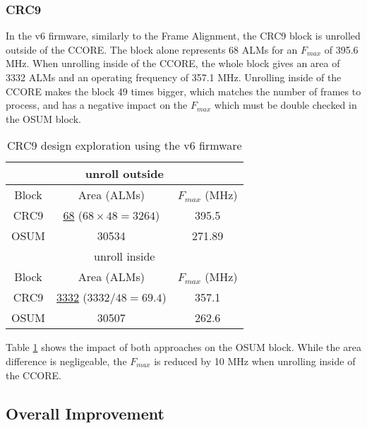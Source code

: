 
\subsubsection{CRC9}

In the v6 firmware, similarly to the Frame Alignment, the CRC9 block is unrolled outside of the CCORE. The block alone represents 68 ALMs for an \(F_{max}\) of 395.6 MHz. When unrolling inside of the CCORE, the whole block gives an area of 3332 ALMs and an operating frequency of 357.1 MHz. Unrolling inside of the CCORE makes the block 49 times bigger, which matches the number of frames to process, and has a negative impact on the \(F_{max}\) which must be double checked in the OSUM block.

\begin{table}[ht]
    \centering
    \begin{tabular}{|c|c|c|}
        \hline
        \hline
        \multicolumn{3}{|c|}{unroll outside} \\
        \hline
        Block & Area (ALMs) & \(F_{max}\) (MHz) \\
        \hline
        CRC9 & \underline{68} (\(68\times48=3264\)) & 395.5 \\
        OSUM & 30534 & 271.89 \\
        \hline
        \hline
        \multicolumn{3}{|c|}{unroll inside} \\
        \hline
        Block & Area (ALMs) & \(F_{max}\) (MHz) \\
        \hline
        CRC9 & \underline{3332} (\(3332/48=69.4\))& 357.1\\
        OSUM & 30507 & 262.6\\
        \hline
    \end{tabular}
    \caption{CRC9 design exploration using the v6 firmware}
    \label{tab:crc9-optimization}
\end{table}

Table \ref{tab:crc9-optimization} shows the impact of both approaches on the OSUM block. While the area difference is negligeable, the \(F_{max}\) is reduced by 10 MHz when unrolling inside of the CCORE. 


\subsection{Overall Improvement}

